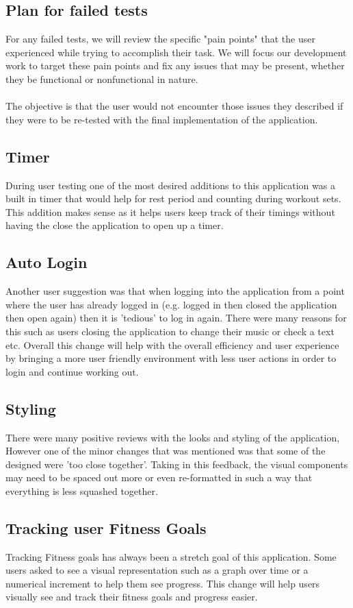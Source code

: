 \documentclass[12pt, titlepage]{article}
\begin{document}
\subsection{Plan for failed tests}
For any failed tests, we will review the specific "pain points" that the user experienced while trying to accomplish their task. We will focus our development work to target these pain points and fix any issues that may be present, whether they be functional or nonfunctional in nature. \\ \\
The objective is that the user would not encounter those issues they described if they were to be re-tested with the final implementation of the application.

\subsection{Timer}
During user testing one of the most desired additions to this application was a built in timer that would help for rest period and counting during workout sets. This addition makes sense as it helps users keep track of their timings without having the close the application to open up a timer. 
\subsection{Auto Login}
Another user suggestion was that when logging into the application from a point where the user has already logged in (e.g. logged in then closed the application then open again) then it is 'tedious' to log in again. There were many reasons for this such as users closing the application to change their music or check a text etc. Overall this change will help with the overall efficiency and user experience by bringing a more user friendly environment with less user actions in order to login and continue working out.
\subsection{Styling}
There were many positive reviews with the looks and styling of the application, However one of the minor changes that was mentioned was that some of the designed were 'too close together'. Taking in this feedback, the visual components may need to be spaced out more or even re-formatted in such a way that everything is less squashed together.
\subsection{Tracking user Fitness Goals}
Tracking Fitness goals  has always been a stretch goal of this application. Some users asked to see a visual representation such as a graph over time or a numerical increment to help them see progress. This change will help users visually see and track their fitness goals and progress easier.
\end{document}
